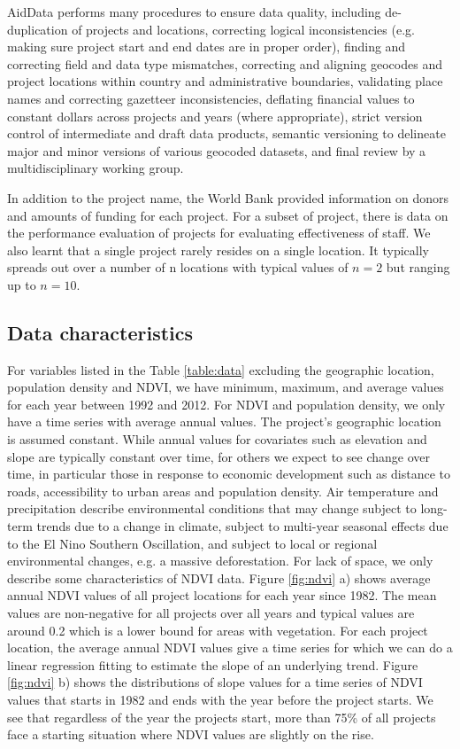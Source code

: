 AidData performs many procedures to ensure data quality, including de-duplication of projects and locations, correcting logical inconsistencies (e.g. making sure project start and end dates are in proper order), finding and correcting field and data type mismatches, correcting and aligning geocodes and project locations within country and administrative boundaries, validating place names and correcting gazetteer inconsistencies, deflating financial values to constant dollars across projects and years (where appropriate), strict version control of intermediate and draft data products, semantic versioning to delineate major and minor versions of various geocoded datasets, and final review by a multidisciplinary working group. 
\par
In addition to the project name, the World Bank provided information on donors and amounts of funding for each project.
For a subset of project, there is data on the performance evaluation of projects for evaluating effectiveness of staff. 
We also learnt that a single project rarely resides on a single location. It typically spreads out over a number of n locations with typical values of $n=2$ but ranging up to $n=10$.

\subsection{Data characteristics}
For variables listed in the Table \ref{table:data} excluding the geographic location, population density and NDVI, we have minimum, maximum, and average values for each year between 1992 and 2012. For NDVI and population density, we only have a time series with average annual values. The project's geographic location is assumed constant. While annual values for covariates such as elevation and slope are typically constant over time, for others we expect to see change over time, in particular those in response to economic development such as distance to roads, accessibility to urban areas and population density. Air temperature and precipitation describe environmental conditions that may change subject to long-term trends due to a change in climate, subject to multi-year seasonal effects due to the El Nino Southern Oscillation, and subject to local or regional environmental changes, e.g. a massive deforestation. For lack of space, we only describe some characteristics of NDVI data.
Figure \ref{fig:ndvi} a) shows average annual NDVI values of all project locations for each year since 1982. The mean values are non-negative for all projects over all years and typical values are around 0.2 which is a lower bound for areas with vegetation.
For each project location, the average annual NDVI values give a time series for which we can do a linear regression fitting to estimate the slope of an underlying trend. Figure \ref{fig:ndvi} b) shows the distributions of slope values for a time series of NDVI values that starts in 1982 and ends with the year before the project starts. We see that regardless of the year the projects start, more than 75\% of all projects face a starting situation where NDVI values are slightly on the rise.

